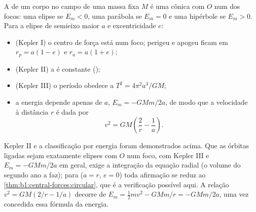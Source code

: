 \begin{theorem}\label{thm:b1:central-forces:conics}
A  de um corpo no campo de uma massa fixa $M$ é uma cônica
com $O$ num dos focos: uma elipse se $E_m < 0$, uma parábola se $E_m = 0$
e uma hipérbole se $E_m > 0$. Para a elipse de semieixo maior $a$ e
excentricidade $e$:
\begin{itemize}
  \item (Kepler I) o centro de força está num foco; perigeu e apogeu
        ficam em $r_p = a(1 - e)$ e $r_a = a(1 + e)$;
  \item (Kepler II) a  é constante ();
  \item (Kepler III) o período obedece a $T^2 = 4\pi^2a^3/GM$;
  \item a energia depende apenas de $a$, $E_m = -GMm/2a$, de modo que a
        velocidade à distância $r$ é dada por
        \[
        v^2 = GM\left(\frac{2}{r} - \frac{1}{a}\right) .
        \]
\end{itemize}
\end{theorem}
\admitted

\begin{remark}\label{rem:b1:central-forces:admitted}
Kepler II e a classificação por energia foram demonstrados acima. Que as
órbitas ligadas sejam exatamente elipses com $O$ num foco, com Kepler III
e $E_m = -GMm/2a$ em geral, exige a integração da equação
radial (o volume do segundo ano a faz); para  ($a = r$,
$e = 0$) toda afirmação se reduz ao \cref{thm:b1:central-forces:circular},
que é a verificação possível aqui. A relação $v^2 = GM(2/r - 1/a)$
decorre de $E_m = \tfrac12 mv^2 - GMm/r = -GMm/2a$, uma vez concedida essa
fórmula da energia.
\end{remark}

